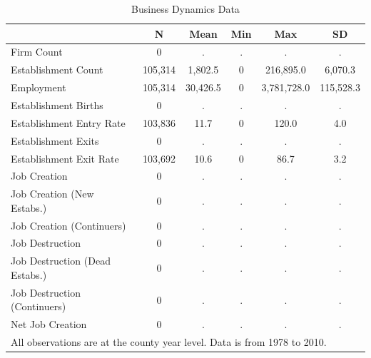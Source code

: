 \begin{table}[htbp]\centering
\def\sym#1{\ifmmode^{#1}\else\(^{#1}\)\fi}
\caption{Business Dynamics Data \label{tab:bds}}
\begin{tabular}{l*{1}{ccccc}}
\toprule
                    &           N&        Mean&         Min&         Max&          SD\\
\midrule
Firm Count          &           0&           .&           .&           .&           .\\
Establishment Count &     105,314&     1,802.5&           0&   216,895.0&     6,070.3\\
Employment          &     105,314&    30,426.5&           0& 3,781,728.0&   115,528.3\\
Establishment Births&           0&           .&           .&           .&           .\\
Establishment Entry Rate&     103,836&        11.7&           0&       120.0&         4.0\\
Establishment Exits &           0&           .&           .&           .&           .\\
Establishment Exit Rate&     103,692&        10.6&           0&        86.7&         3.2\\
Job Creation        &           0&           .&           .&           .&           .\\
Job Creation (New Estabs.)&           0&           .&           .&           .&           .\\
Job Creation (Continuers)&           0&           .&           .&           .&           .\\
Job Destruction     &           0&           .&           .&           .&           .\\
Job Destruction (Dead Estabs.)&           0&           .&           .&           .&           .\\
Job Destruction (Continuers)&           0&           .&           .&           .&           .\\
Net Job Creation    &           0&           .&           .&           .&           .\\
\bottomrule
\multicolumn{6}{l}{\footnotesize All observations are at the county year level. Data is from 1978 to 2010.}\\
\end{tabular}
\end{table}
